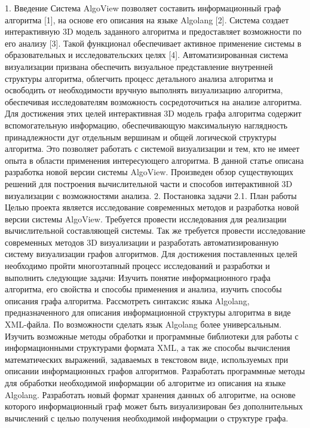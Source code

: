 1. Введение
Система AlgoView позволяет составить информационный граф алгоритма [1], на основе его описания на языке Algolang [2]. Система создает интерактивную 3D модель заданного алгоритма и предоставляет возможности по его анализу [3]. Такой функционал обеспечивает активное применение системы в образовательных и исследовательских целях [4].
Автоматизированная система визуализации призвана обеспечить визуальное представление внутренней структуры алгоритма, облегчить процесс детального анализа алгоритма и освободить от необходимости вручную выполнять визуализацию алгоритма, обеспечивая исследователям возможность сосредоточиться на анализе алгоритма. Для достижения этих целей интерактивная 3D модель графа алгоритма содержит вспомогательную информацию, обеспечивающую максимальную наглядность принадлежности дуг отдельным вершинам и общей логической структуры алгоритма. Это позволяет работать с системой визуализации и тем, кто не имеет опыта в области применения интересующего алгоритма.
В данной статье описана разработка новой версии системы AlgoView. Произведен обзор существующих решений для построения вычислительной части и способов интерактивной 3D визуализации с возможностями анализа.
2. Постановка задачи
2.1. План работы
Целью проекта является исследование современных методов и разработка новой версии системы AlgoView. Требуется провести исследования для реализации вычислительной составляющей системы. Так же требуется провести исследование современных методов 3D визуализации и разработать автоматизированную систему визуализации графов алгоритмов. Для достижения поставленных целей необходимо пройти многоэтапный процесс исследований и разработки и выполнить следующие задачи:
Изучить понятие информационного графа алгоритма, его свойства и способы применения и анализа, изучить способы описания графа алгоритма. Рассмотреть синтаксис языка Algolang, предназначенного для описания информационной структуры алгоритма в виде XML-файла. По возможности сделать язык Algolang более универсальным.
Изучить возможные методы обработки и программные библиотеки для работы с информационными структурами формата XML, а так же способы вычисления математических выражений, задаваемых в текстовом виде, используемых при описании информационных графов алгоритмов.
Разработать программные методы для обработки необходимой информации об алгоритме из описания на языке Algolang.
Разработать новый формат хранения данных об алгоритме, на основе которого информационный граф может быть визуализирован без дополнительных вычислений с целью получения необходимой информации о структуре графа.
